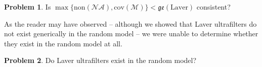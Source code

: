 \documentclass[12pt]{article}
\theoremstyle{definition}
\newtheorem{problem}{\sc Problem}
\begin{document}
\begin{problem}
Is $\max\{\text{non}(\mathcal{NA}), \text{cov}(\mathcal{M})\}<\mathfrak{ge}(\text{Laver})$ consistent?
\end{problem}

As the reader may have observed -- although we showed that Laver ultrafilters do not exist generically in the random model -- we were unable to determine whether they exist in the random model at all.

\begin{problem}
Do Laver ultrafilters exist in the random model?
\end{problem}


\let\OLDthebibliography\thebibliography
\renewcommand\thebibliography[1]{
  \OLDthebibliography{#1}
  \setlength{\parskip}{0pt}
  \setlength{\itemsep}{3pt plus 0.3ex}
}



\end{document}
